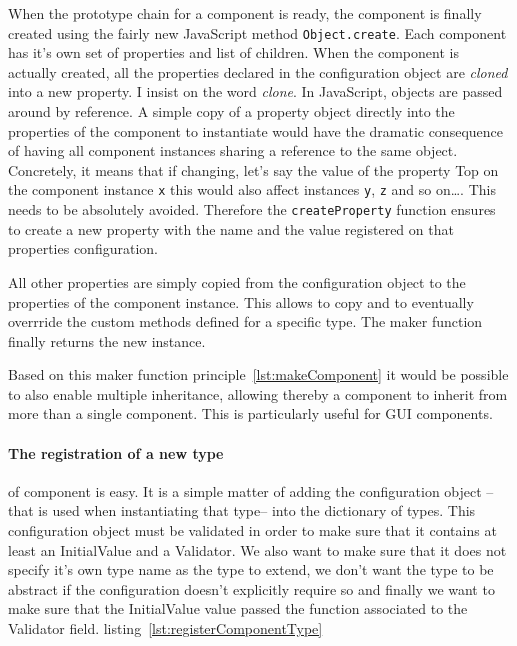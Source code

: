 When the prototype chain for a component is ready, the component is finally created using the fairly new JavaScript method \texttt{Object.create}. Each component has it's own set of properties and list of children. When the component is actually created, all the properties declared in the configuration object are \emph{cloned} into a new property. I insist on the word \emph{clone}. In JavaScript, objects are passed around by reference. A simple copy of a property object directly into the properties of the component to instantiate would have the dramatic consequence of having all component instances sharing a reference to the same object. Concretely, it means that if changing, let's say the value of the property Top on the component instance \texttt{x} this would also affect instances \texttt{y}, \texttt{z} and so on\dots. This needs to be absolutely avoided. Therefore the \texttt{createProperty} function ensures to create a new property with the name and the value registered on that properties configuration.

All other properties are simply copied from the configuration object to the properties of the component instance. This allows to copy and to eventually overrride the custom methods defined for a specific type. The maker function finally returns the new instance.

Based on this maker function principle~\ref{lst:makeComponent} it would be possible to also enable multiple inheritance, allowing thereby a component to inherit from more than a single component. This is particularly useful for GUI components.



\paragraph{The registration of a new type} of component is easy. It is a simple matter of adding the configuration object --that is used when instantiating that type-- into the dictionary of types. This configuration object must be validated in order to make sure that it contains at least an InitialValue and a Validator. We also want to make sure that it does not specify it's own type name as the type to extend, we don't want the type to be abstract if the configuration doesn't explicitly require so and finally we want to make sure that the InitialValue value passed the function associated to the Validator field. listing~\ref{lst:registerComponentType}

